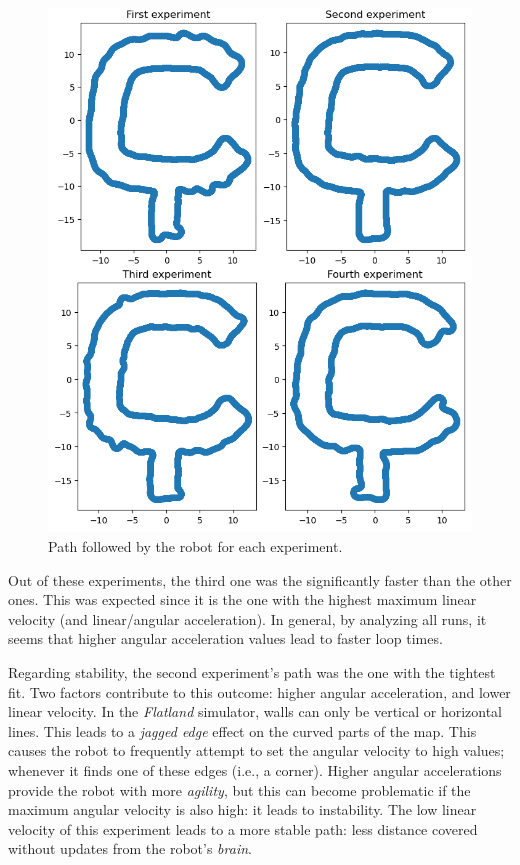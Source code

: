 \documentclass[conference]{IEEEtran}
\begin{document}
\begin{figure}[htbp]
    \centerline{\includegraphics{images/experiments.png}}
    \caption{Path followed by the robot for each experiment.}
    \label{fig:path}
\end{figure}

Out of these experiments, the third one was the significantly faster than the other ones. This was expected since it is the one with the highest maximum linear velocity (and linear/angular acceleration). In general, by analyzing all runs, it seems that higher angular acceleration values lead to faster loop times.

Regarding stability, the second experiment's path was the one with the tightest fit. Two factors contribute to this outcome: higher angular acceleration, and lower linear velocity. In the \emph{Flatland} simulator, walls can only be vertical or horizontal lines. This leads to a \textit{jagged edge} effect on the curved parts of the map. This causes the robot to frequently attempt to set the angular velocity to high values; whenever it finds one of these edges (i.e., a corner). Higher angular accelerations provide the robot with more \textit{agility}, but this can become problematic if the maximum angular velocity is also high: it leads to instability. The low linear velocity of this experiment leads to a more stable path: less distance covered without updates from the robot's \textit{brain}.
\end{document}
